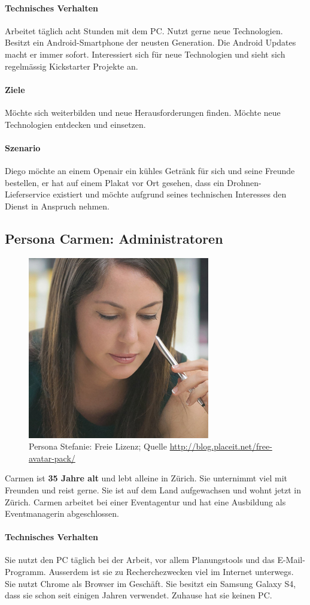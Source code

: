 \paragraph{Technisches Verhalten}
Arbeitet täglich acht Stunden mit dem PC. Nutzt gerne neue Technologien. Besitzt ein Android-Smartphone der neusten Generation. Die Android Updates macht er immer sofort. Interessiert sich für neue Technologien und sieht sich regelmässig Kickstarter Projekte an.
\paragraph{Ziele}
Möchte sich weiterbilden und neue Herausforderungen finden. Möchte neue Technologien entdecken und einsetzen.
\paragraph{Szenario}
Diego möchte an einem Openair ein kühles Getränk für sich und seine Freunde bestellen, er hat auf einem Plakat vor Ort gesehen, dass ein Drohnen-Lieferservice existiert und möchte aufgrund seines technischen Interesses den Dienst in Anspruch nehmen.
\subsection{Persona Carmen: Administratoren}
\begin{figure}[h]
\centering
	\includegraphics[width=.35\textwidth]{images/persona-stefanie.jpg}
	\caption{Persona Stefanie: Freie Lizenz; Quelle
	 \protect\url{http://blog.placeit.net/free-avatar-pack/}}
	\label{fig:stefanie}
\end{figure}
Carmen ist \textbf{35 Jahre alt} und lebt alleine in Zürich.
Sie unternimmt viel mit Freunden und reist gerne. Sie ist auf dem Land aufgewachsen und wohnt jetzt in Zürich.
Carmen arbeitet bei einer Eventagentur und hat eine Ausbildung als Eventmanagerin abgeschlossen.

\paragraph{Technisches Verhalten}
Sie nutzt den PC täglich bei der Arbeit, vor allem Planungstools und das E-Mail-Programm. Ausserdem ist sie zu Recherchezwecken viel im Internet unterwegs. Sie nutzt Chrome als Browser im Geschäft. Sie besitzt ein Samsung Galaxy S4, dass sie schon seit einigen Jahren verwendet. Zuhause hat sie keinen PC.
